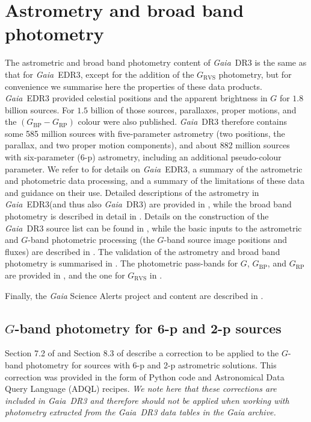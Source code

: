 \documentclass[longauth]{aa}
\providecommand{\bpminrp}{\ensuremath{(G_\mathrm{BP}-G_\mathrm{RP})}\xspace}
\providecommand\gmag{\ensuremath{G}\xspace}
\providecommand\gbp{\ensuremath{G_\mathrm{BP}}\xspace}
\providecommand\grp{\ensuremath{G_\mathrm{RP}}\xspace}
\providecommand\grvs{\ensuremath{G_\mathrm{RVS}}\xspace}
\newcommand\gaia{\textit{Gaia}\xspace}
\providecommand\gedrthree{\textit{Gaia}~EDR3\xspace}
\providecommand\gdrthree{\textit{Gaia}~DR3\xspace}
\providecommand\gdr[1]{\textit{Gaia}~DR#1\xspace}
\providecommand\gedr[1]{\textit{Gaia}~EDR#1\xspace}
\begin{document}
\section{Astrometry and broad band photometry}\label{ssec:edr3}

The astrometric and broad band photometry content of \gdrthree is  the same as that for \gedrthree, except for the addition of the \grvs photometry, but for convenience we summarise here the properties of these data products. \gedr{3} provided celestial positions and the apparent brightness in $G$ for $1.8$ billion sources. For $1.5$ billion of those sources, parallaxes, proper motions, and the \bpminrp colour were also published. \gdr{3} therefore contains some 585 million sources with five-parameter astrometry (two positions, the parallax, and two proper motion components), and about 882 million sources with six-parameter (6-p) astrometry, including an additional pseudo-colour parameter. We refer to \cite{EDR3-DPACP-130} for details on \gedrthree, a summary of the astrometric and photometric data processing, and a  summary of the limitations of these data and guidance on their use. Detailed descriptions of the astrometry in \gedrthree (and thus also \gdrthree) are provided in \cite{EDR3-DPACP-128}, while the broad band photometry is described in detail in \cite{EDR3-DPACP-117}. Details on the construction of the \gdr{3} source list can be found in \cite{EDR3-DPACP-124}, while the basic inputs to the astrometric and $G$-band photometric processing (the $G$-band source image positions and fluxes) are described in \cite{EDR3-DPACP-73}. The validation of the astrometry and broad band photometry is summarised in \cite{EDR3-DPACP-126}. The photometric pass-bands for \gmag, \gbp, and \grp are provided in \cite{EDR3-DPACP-117}, and the one for \grvs in \cite{DR3-DPACP-155}.

Finally, the \gaia Science Alerts project and content are described in \citet{Hodgkin2021}.

\subsection{$G$-band photometry for 6-p and 2-p sources}\label{ssec:gcorr}

Section 7.2 of \cite{EDR3-DPACP-130} and Section 8.3 of \cite{EDR3-DPACP-117} describe a correction to be applied to the $G$-band photometry for sources with 6-p and 2-p astrometric solutions. This correction was provided in the form of Python code and Astronomical Data Query Language (ADQL) recipes. \textit{We note here that these corrections are included in \gdr{3} and therefore should  not be applied when working with photometry extracted from the \gdr{3} data tables in the \gaia archive.}
\end{document}

